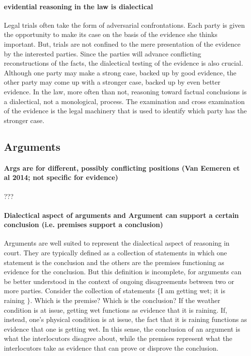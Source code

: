 \documentclass[10pt]{article}
\begin{document}

\paragraph{evidential reasoning in the law is dialectical} 

Legal trials often take the form of adversarial confrontations.  Each party is given the opportunity to make its case on the basis of the evidence she thinks important. But, 
trials are not confined to the mere presentation of the 
evidence by the interested parties. Since the parties will advance conflicting reconstructions of the facts, 
the dialectical testing of the evidence is also crucial. 
Although one party may make a strong case, backed up by good evidence, %
the other party may come up with a stronger case, backed up by even better evidence.  In the law, more often than not, reasoning toward factual 
conclusions is a dialectical, not a monological, process. The examination and cross examination of the evidence 
is the legal machinery that is used to identify which party has the stronger case.

\subsection{Arguments}


\paragraph{Args are for different, possibly conflicting positions (Van Eemeren et al 2014; not specific for evidence)}

???

\paragraph{Dialectical aspect of arguments and Argument can support a certain conclusion (i.e. premises support a conclusion)}

Arguments are well suited to represent the dialectical aspect of reasoning in court. They are 
typically defined as a collection of statements in which one statement is the conclusion and 
the others are the premises functioning as evidence for the conclusion. But this definition is incomplete, for arguments can be better understood in the context of ongoing disagreements 
between two or more parties. Consider the collection of statements $\{$I am getting wet; it is raining $\}$. Which is the premise? Which is the conclusion?  If the weather condition is at issue, getting wet functions as evidence that it is raining. If, instead, one's physical condition is at issue, the fact that it 
is raining functions as evidence that one is getting wet. In this sense, the conclusion of an argument is what the interlocutors disagree about, while the premises 
represent what the interlocutors take as evidence that can prove or disprove the conclusion. 
\end{document}
